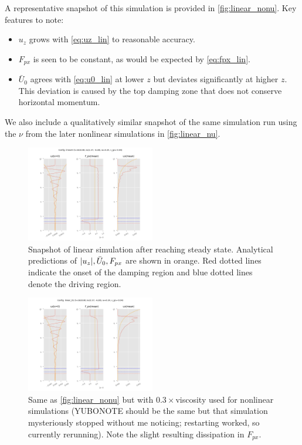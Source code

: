 \documentclass[twocolumn,
        usenames, %
        dvipsnames %
    ]{revtex4-1}%
\DeclarePairedDelimiter\abs{\lvert}{\rvert}
\begin{document}
A representative snapshot of this simulation
is provided in \autoref{fig:linear_nonu}. Key features to note:
\begin{itemize}
    \item $u_z$ grows with \autoref{eq:uz_lin} to reasonable accuracy.

    \item $F_{px}$ is seen to be constant, as would be expected by
        \autoref{eq:fpx_lin}.

    \item $\bar{U}_0$ agrees with \autoref{eq:u0_lin} at lower $z$ but deviates
        significantly at higher $z$. This deviation is caused by the top damping
        zone that does not conserve horizontal momentum.
\end{itemize}
We also include a qualitatively similar snapshot of the same simulation run
using the $\nu$ from the later nonlinear simulations in \autoref{fig:linear_nu}.
\begin{figure}[h]
    \centering
    \includegraphics[width=0.5\textwidth]{plots/linear_nonu.png}
    \caption{Snapshot of linear simulation after reaching steady state.
        Analytical predictions of $\abs*{u_z}, \bar{U}_0, F_{px}$ are shown in
        orange. Red dotted lines indicate the onset of the damping region and
        blue dotted lines denote the driving region.}\label{fig:linear_nonu}
\end{figure}
\begin{figure}[h]
    \centering
    \includegraphics[width=0.5\textwidth]{plots/linear_nu.png}
    \caption{Same as \autoref{fig:linear_nonu} but with $0.3\times $viscosity
    used for nonlinear simulations (YUBONOTE should be the same but that
    simulation mysteriously stopped without me noticing; restarting worked, so
    currently rerunning). Note the slight resulting dissipation in $F_{px}$.
    }\label{fig:linear_nu}
\end{figure}
\end{document}
